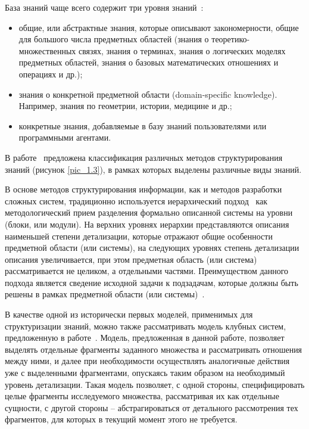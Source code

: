 База знаний чаще всего содержит три уровня знаний~\cite{Lapshin2010}:
\begin{itemize}
  \item общие, или абстрактные знания, которые описывают закономерности, общие для большого числа предметных областей (знания о теоретико-множественных связях, знания о терминах, знания о логических моделях предметных областей, знания о базовых математических отношениях и операциях и др.);
  \item знания о конкретной предметной области (domain-specific knowledge). Например, знания по геометрии, истории, медицине и др.;
  \item конкретные знания, добавляемые в базу знаний пользователями или программными агентами.
\end{itemize}

В работе~\cite{Gavrilova2008} предложена классификация различных методов структурирования знаний (рисунок \ref{pic_1.3}), в рамках которых выделены различные виды знаний.

В основе методов структурирования информации, как и методов разработки сложных систем, традиционно используется иерархический подход~\cite{Mesarovich1978} как методологический прием разделения формально описанной системы на уровни (блоки, или модули). На верхних уровнях иерархии представляются описания наименьшей степени детализации, которые отражают общие особенности предметной области (или системы), на следующих уровнях степень детализации описания увеличивается, при этом предметная область (или система) рассматривается не целиком, а отдельными частями. Преимуществом данного подхода является сведение исходной задачи к подзадачам, которые должны быть решены в рамках предметной области (или системы)~\cite{Gavrilova2016}.

В качестве одной из исторически первых моделей, применимых для структуризации знаний, можно также рассматривать модель клубных систем, предложенную в работе~\cite{Borschev1976}. Модель, предложенная в данной работе, позволяет выделять отдельные фрагменты заданного множества и рассматривать отношения между ними, и далее при необходимости осуществлять аналогичные действия уже с выделенными фрагментами, опускаясь таким образом на необходимый уровень детализации. Такая модель позволяет, с одной стороны, специфицировать целые фрагменты исследуемого множества, рассматривая их как отдельные сущности, с другой стороны – абстрагироваться от детального рассмотрения тех фрагментов, для которых в текущий момент этого не требуется.


